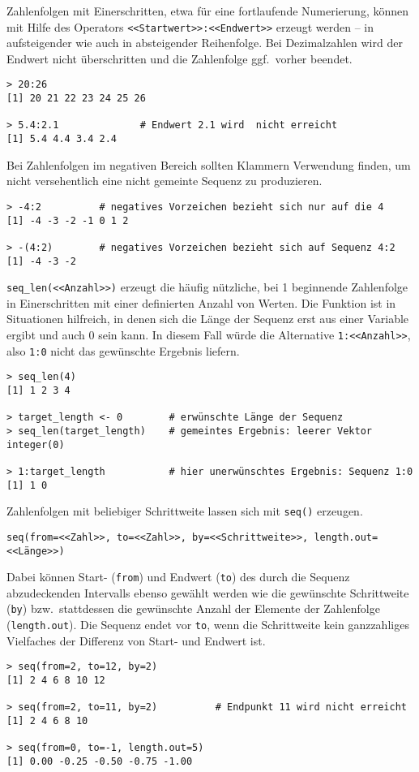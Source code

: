 Zahlenfolgen mit Einerschritten, etwa für eine fortlaufende Numerierung, können mit Hilfe des Operators \lstinline!<<Startwert>>:<<Endwert>>! erzeugt werden -- in aufsteigender wie auch in absteigender Reihenfolge. Bei Dezimalzahlen wird der Endwert nicht überschritten und die Zahlenfolge ggf.\ vorher beendet.
\begin{lstlisting}
> 20:26
[1] 20 21 22 23 24 25 26

> 5.4:2.1              # Endwert 2.1 wird  nicht erreicht
[1] 5.4 4.4 3.4 2.4
\end{lstlisting}

Bei Zahlenfolgen im negativen Bereich sollten Klammern Verwendung finden, um nicht versehentlich eine nicht gemeinte Sequenz zu produzieren.
\begin{lstlisting}
> -4:2          # negatives Vorzeichen bezieht sich nur auf die 4
[1] -4 -3 -2 -1 0 1 2

> -(4:2)        # negatives Vorzeichen bezieht sich auf Sequenz 4:2
[1] -4 -3 -2
\end{lstlisting}

\lstinline!seq_len(<<Anzahl>>)! erzeugt die häufig nützliche, bei 1 beginnende Zahlenfolge in Einerschritten mit einer definierten Anzahl von Werten. Die Funktion ist in Situationen hilfreich, in denen sich die Länge der Sequenz erst aus einer Variable ergibt und auch 0 sein kann. In diesem Fall würde die Alternative \lstinline!1:<<Anzahl>>!, also \lstinline!1:0! nicht das gewünschte Ergebnis liefern.
\begin{lstlisting}
> seq_len(4)
[1] 1 2 3 4

> target_length <- 0        # erwünschte Länge der Sequenz
> seq_len(target_length)    # gemeintes Ergebnis: leerer Vektor
integer(0)

> 1:target_length           # hier unerwünschtes Ergebnis: Sequenz 1:0
[1] 1 0 
\end{lstlisting}

Zahlenfolgen mit beliebiger Schrittweite lassen sich mit \lstinline!seq()! erzeugen.
\begin{lstlisting}
seq(from=<<Zahl>>, to=<<Zahl>>, by=<<Schrittweite>>, length.out=<<Länge>>)
\end{lstlisting}

Dabei können Start- (\lstinline!from!) und Endwert (\lstinline!to!) des durch die Sequenz abzudeckenden Intervalls ebenso gewählt werden wie die gewünschte Schrittweite (\lstinline!by!) bzw.\ stattdessen die gewünschte Anzahl der Elemente der Zahlenfolge (\lstinline!length.out!). Die Sequenz endet vor \lstinline!to!, wenn die Schrittweite kein ganzzahliges Vielfaches der Differenz von Start- und Endwert ist.
\begin{lstlisting}
> seq(from=2, to=12, by=2)
[1] 2 4 6 8 10 12

> seq(from=2, to=11, by=2)          # Endpunkt 11 wird nicht erreicht
[1] 2 4 6 8 10

> seq(from=0, to=-1, length.out=5)
[1] 0.00 -0.25 -0.50 -0.75 -1.00
\end{lstlisting}

